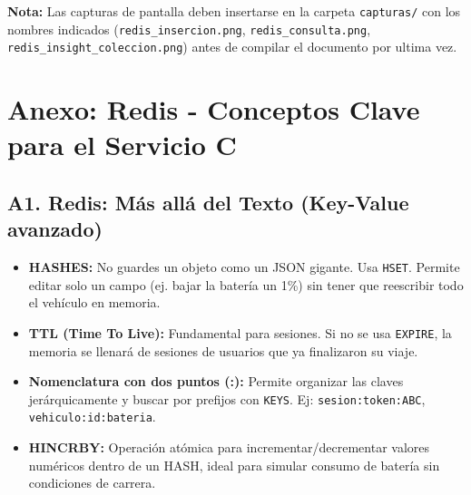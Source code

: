 \documentclass[12pt,a4paper]{article}
\begin{document}
\textbf{Nota:} Las capturas de pantalla deben insertarse en la carpeta \texttt{capturas/} con los nombres indicados (\texttt{redis\_insercion.png}, \texttt{redis\_consulta.png}, \texttt{redis\_insight\_coleccion.png}) antes de compilar el documento por ultima vez.

\appendix
\section*{Anexo: Redis - Conceptos Clave para el Servicio C}

\subsection*{A1. Redis: M\'as all\'a del Texto (Key-Value avanzado)}
\begin{itemize}
    \item \textbf{HASHES:} No guardes un objeto como un JSON gigante. Usa \texttt{HSET}. Permite editar solo un campo (ej. bajar la bater\'ia un 1\%) sin tener que reescribir todo el veh\'iculo en memoria.
    \item \textbf{TTL (Time To Live):} Fundamental para sesiones. Si no se usa \texttt{EXPIRE}, la memoria se llenar\'a de sesiones de usuarios que ya finalizaron su viaje.
    \item \textbf{Nomenclatura con dos puntos (:):} Permite organizar las claves jer\'arquicamente y buscar por prefijos con \texttt{KEYS}. Ej: \texttt{sesion:token:ABC}, \texttt{vehiculo:id:bateria}.
    \item \textbf{HINCRBY:} Operaci\'on at\'omica para incrementar/decrementar valores num\'ericos dentro de un HASH, ideal para simular consumo de bater\'ia sin condiciones de carrera.
\end{itemize}
\end{document}
